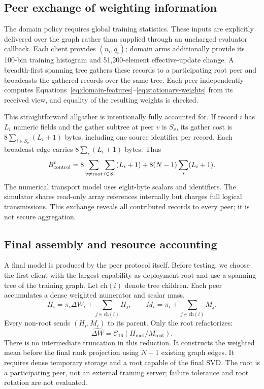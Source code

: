 \documentclass[11pt]{article}
\newcommand{\dW}{\Delta W}
\begin{document}
\subsection{Peer exchange of weighting information}
The domain policy requires global training statistics. These inputs are explicitly delivered over the graph rather than supplied through an uncharged evaluator callback. Each client provides $(n_i,q_i)$; domain arms additionally provide its 100-bin training histogram and 51,200-element effective-update change. A breadth-first spanning tree gathers these records to a participating root peer and broadcasts the gathered records over the same tree. Each peer independently computes Equations~\eqref{eq:domain-features}--\eqref{eq:stationary-weights} from its received view, and equality of the resulting weights is checked.

This straightforward allgather is intentionally fully accounted for. If record $i$ has $L_i$ numeric fields and the gather subtree at peer $v$ is $S_v$, its gather cost is $8\sum_{i\in S_v}(L_i+1)$ bytes, including one source identifier per record. Each broadcast edge carries $8\sum_i(L_i+1)$ bytes. Thus
\begin{equation}
 B_{\rm control}^t=8\sum_{v\ne\mathrm{root}}\sum_{i\in S_v}(L_i+1)
 +8(N-1)\sum_i(L_i+1).
 \label{eq:allgather-cost}
\end{equation}
The numerical transport model uses eight-byte scalars and identifiers. The simulator shares read-only array references internally but charges full logical transmissions. This exchange reveals all contributed records to every peer; it is not secure aggregation.

\subsection{Final assembly and resource accounting}
A final model is produced by the peer protocol itself. Before testing, we choose the first client with the largest capability as deployment root and use a spanning tree of the training graph. Let $\mathrm{ch}(i)$ denote tree children. Each peer accumulates a dense weighted numerator and scalar mass,
\begin{equation}
 H_i=\pi_i\dW_i+\sum_{j\in\mathrm{ch}(i)}H_j,
 \qquad M_i=\pi_i+\sum_{j\in\mathrm{ch}(i)}M_j.
\end{equation}
Every non-root sends $(H_i,M_i)$ to its parent. Only the root refactorizes:
\begin{equation}
 \widehat{\dW}=\mathcal C_{16}(H_{\mathrm{root}}/M_{\mathrm{root}}).
 \label{eq:peer-assembly}
\end{equation}
There is no intermediate truncation in this reduction. It constructs the weighted mean before the final rank projection using $N-1$ existing graph edges. It requires dense temporary storage and a root capable of the final SVD. The root is a participating peer, not an external training server; failure tolerance and root rotation are not evaluated.
\end{document}
